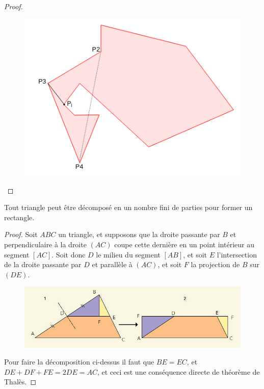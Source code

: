 \begin{proof}
  \begin{figure}[h]
      \centering
      \includegraphics[scale=0.6]{images/x6.png}

  \end{figure}
\end{proof}
\begin{li}
  Tout triangle peut être décomposé en un nombre fini de parties pour former un rectangle.
\end{li}
\begin{proof}
  \hfill

  \noindent
  Soit $ABC$ un triangle, et supposons que la droite passante par $B$ et perpendiculaire à la droite $(AC)$ coupe cette dernière en un point intérieur au segment $[AC]$. Soit donc $D$ le milieu du segment $[AB]$, et soit $E$ l'intersection de la droite passante par $D$ et parallèle à $(AC)$, et soit $F$ la projection de $B$ sur $(DE)$.

  \begin{figure}[h]
          \centering
          \includegraphics[scale=0.6]{images/xx1.png}

      \end{figure}
\noindent
  Pour faire la décomposition ci-dessus il faut que  $BE = EC$, et $DE+DF+FE=2DE = AC$, et ceci est une conséquence directe de théorème de Thalès.

\end{proof}
